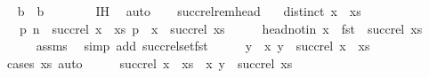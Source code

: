 \begin{isabellebody}
\ \isamarkupfalse%
\ {\isachardoublequoteopen}b{}\ {\isacharequal}\ b{}{\isachardoublequoteclose}\isanewline
\ \ \ \ \ \ \isamarkupfalse%
\ {\isachardoublequoteopen}{}{\isachardot}IH{\isachardoublequoteclose}\ \isamarkupfalse%
\ auto\isanewline
\ \ \isamarkupfalse%
\isanewline
{}\isamarkupfalse%
%
\endisatagproof
{\isafoldproof}%
%
\isadelimproof
\isanewline
%
\endisadelimproof
\isanewline
{}\isamarkupfalse%
\ succ{\isacharunderscore}rel{\isacharunderscore}rem{\isacharunderscore}head{\isacharcolon}\isanewline
\ \ \ {\isachardoublequoteopen}distinct\ {\isacharparenleft}x\ {\isacharhash}\ xs{\isacharparenright}{\isachardoublequoteclose}\isanewline
\ \ \ {\isachardoublequoteopen}{\isacharbraceleft}{\isacharparenleft}p{\isacharcomma}\ n{\isacharparenright}\ {\isasymin}\ succ{\isacharunderscore}rel\ {\isacharparenleft}x\ {\isacharhash}\ xs{\isacharparenright}{\isachardot}\ p\ {\isasymnoteq}\ x{\isacharbraceright}\ {\isacharequal}\ succ{\isacharunderscore}rel\ xs{\isachardoublequoteclose}\isanewline
%
\isadelimproof
%
\endisadelimproof
%
\isatagproof
{}\isamarkupfalse%
\ {\isacharminus}\isanewline
\ \ \isamarkupfalse%
\ head{\isacharunderscore}notin{\isacharcolon}\ {\isachardoublequoteopen}x\ {\isasymnotin}\ fst\ {\isacharbackquote}\ succ{\isacharunderscore}rel\ xs{\isachardoublequoteclose}\isanewline
\ \ \ \ \isamarkupfalse%
\ assms\ \isamarkupfalse%
\ {\isacharparenleft}simp\ add{\isacharcolon}\ succ{\isacharunderscore}rel{\isacharunderscore}set{\isacharunderscore}fst{\isacharparenright}\isanewline
\ \ \isamarkupfalse%
\ \isamarkupfalse%
\ y\ \ {\isachardoublequoteopen}{\isacharparenleft}x{\isacharcomma}\ y{\isacharparenright}\ {\isasymin}\ succ{\isacharunderscore}rel\ {\isacharparenleft}x\ {\isacharhash}\ xs{\isacharparenright}{\isachardoublequoteclose}\isanewline
\ \ \ \ \isamarkupfalse%
\ {\isacharparenleft}cases\ xs{\isacharcomma}\ auto{\isacharparenright}\isanewline
\ \ \isamarkupfalse%
\ \isamarkupfalse%
\ {\isachardoublequoteopen}succ{\isacharunderscore}rel\ {\isacharparenleft}x\ {\isacharhash}\ xs{\isacharparenright}\ {\isacharequal}\ {\isacharbraceleft}{\isacharparenleft}x{\isacharcomma}\ y{\isacharparenright}{\isacharbraceright}\ {\isasymunion}\ succ{\isacharunderscore}rel\ xs{\isachardoublequoteclose}\isanewline

\end{isabellebody}
